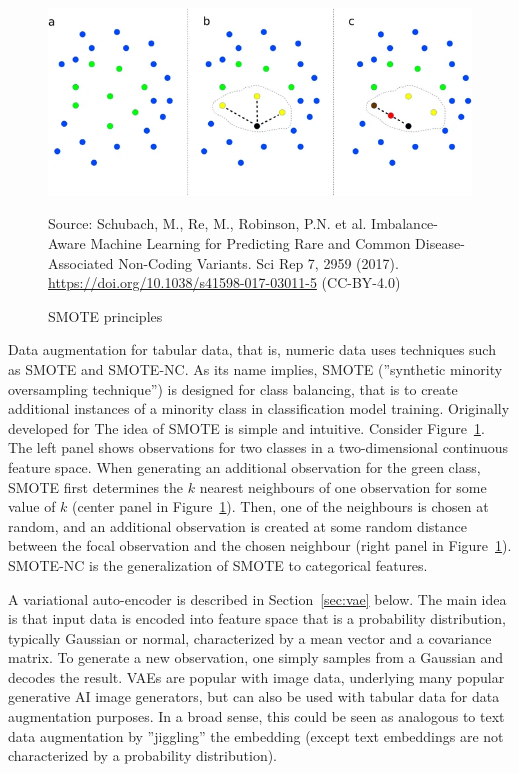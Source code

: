 \begin{figure}
\centering
\includegraphics[width=\textwidth]{smote.png} 

\tiny Source: Schubach, M., Re, M., Robinson, P.N. et al. Imbalance-Aware Machine Learning for Predicting Rare and Common Disease-Associated Non-Coding Variants. Sci Rep 7, 2959 (2017). \url{https://doi.org/10.1038/s41598-017-03011-5} (CC-BY-4.0)
\normalsize
\caption{SMOTE principles}
\label{fig:smote}
\end{figure}

Data augmentation for tabular data, that is, numeric data uses techniques such as SMOTE and SMOTE-NC. As its name implies, SMOTE (''synthetic minority oversampling technique'') is designed for class balancing, that is to create additional instances of a minority class in classification model training. Originally developed for The idea of SMOTE is simple and intuitive. Consider Figure~\ref{fig:smote}. The left panel shows observations for two classes in a two-dimensional continuous feature space. When generating an additional observation for the green class, SMOTE first determines the $k$ nearest neighbours of one observation for some value of $k$ (center panel in Figure~\ref{fig:smote}). Then, one of the neighbours is chosen at random, and an additional observation is created at some random distance between the focal observation and the chosen neighbour (right panel in Figure~\ref{fig:smote}). SMOTE-NC is the generalization of SMOTE to categorical features.

A variational auto-encoder is described in Section~\ref{sec:vae} below. The main idea is that input data is encoded into feature space that is a probability distribution, typically Gaussian or normal, characterized by a mean vector and a covariance matrix. To generate a new observation, one simply samples from a Gaussian and decodes the result. VAEs are popular with image data, underlying many popular generative AI image generators, but can also be used with tabular data for data augmentation purposes. In a broad sense, this could be seen as analogous to text data augmentation by ''jiggling'' the embedding (except text embeddings are not characterized by a probability distribution). 


